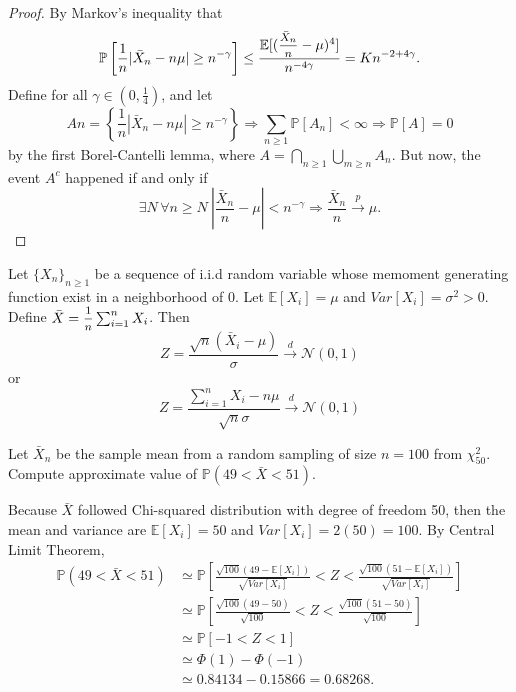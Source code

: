 \begin{proof}
    By Markov's inequality that 
    \[
        \mathbb{P} \left[ \frac{1}{n}|\bar{X}_n - n\mu| \geq n^{-\gamma}\right] 
        \leq \frac{\mathbb{E}[(\mfrac{\bar{X}_n}{n} - \mu)^4]}{n^{-4\gamma}} = Kn^{-2+4\gamma}.
    \]
    Define for all $\gamma \in \left(0, \frac{1}{4}\right)$, and let 
    \[
        An = \left\{ \frac{1}{n}|\bar{X}_n - n\mu| \geq n^{-\gamma} \right\} \Rightarrow 
        \sum_{n \geq 1} \mathbb{P}[A_n] < \infty \Rightarrow 
        \mathbb{P}[A] = 0
    \]
    by the first Borel-Cantelli lemma, where $A = \bigcap_{n \geq 1} \bigcup_{m \geq n} A_n$. But now, the event 
    $A^c$ happened if and only if 
    \[
        \exists N\, \forall n \geq N \> \left| \frac{\bar{X}_n}{n} - \mu \right| < n^{-\gamma} 
        \Rightarrow \frac{\bar{X}_n}{n} \xrightarrow[]{p} \mu.
    \]
\end{proof}

\begin{theorem}
    Let $\{X_n\}_{n \geq 1}$ be a sequence of i.i.d random variable whose memoment generating function 
    exist in a neighborhood of 0. Let $\mathbb{E}[X_i] = \mu$ and $Var[X_i] = \sigma^2 > 0$. Define
    $\bar{X} = \mfrac{1}{n} \sum^n_{i=1} X_i$. Then 
    \begin{equation}
        Z = \frac{\sqrt{n} (\bar{X}_i - \mu)}{\sigma} \xrightarrow[]{d} \mathcal{N}(0,1)
    \end{equation}
    or 
    \begin{equation}
        Z = \frac{\sum^n_{i=1} X_i - n\mu}{\sqrt{n} \sigma} \xrightarrow[]{d} \mathcal{N}(0,1)
    \end{equation}
\end{theorem}

\begin{example}
    Let $\bar{X}_n$ be the sample mean from a random sampling of size 
    $n = 100$ from $\chi^2_{50}$. Compute approximate value of 
    $\mathbb{P}(49 < \bar{X} < 51)$.
\end{example}
\begin{solution}
    Because $\bar{X}$ followed Chi-squared distribution with degree of freedom 50, then the mean and variance are 
    $\mathbb{E}[X_i] = 50$ and $Var[X_i] = 2(50) = 100$. By Central Limit Theorem, 
    \begin{align*}
        \mathbb{P}(49 < \bar{X} < 51) &\simeq  
        \mathbb{P} \left[ \frac{\sqrt{100} (49 - \mathbb{E}[X_i])}{\sqrt{Var[X_i]}} < Z < \frac{\sqrt{100} (51 - \mathbb{E}[X_i])}{\sqrt{Var[X_i]}} \right]\\
        &\simeq \mathbb{P} \left[ \frac{\sqrt{100} (49 - 50)}{\sqrt{100}} < Z < \frac{\sqrt{100} (51 - 50)}{\sqrt{100}} \right]\\
        &\simeq \mathbb{P} \left[ -1 < Z < 1 \right]\\
        &\simeq \Phi(1) - \Phi(-1)\\
        &\simeq 0.84134 - 0.15866 = 0.68268.
    \end{align*} 
\end{solution}

